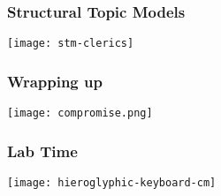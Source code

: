 \documentclass[11pt,compress,professionalfonts]{beamer}
\newcommand{\ita}{\begin{itemize}}
\newcommand{\itm}{\item[]}
\newcommand{\itz}{\end{itemize}}
\begin{document}
\begin{frame}[t,fragile]\frametitle{Structural Topic Models}

\centerline{\texttt{[image: stm-clerics]}}

\end{frame}
\begin{frame}[t,fragile]\frametitle{Wrapping up}

\centerline{\texttt{[image: compromise.png]}}


\end{frame}
\begin{frame}[t,fragile]\frametitle{Lab Time}

\centerline{\texttt{[image: hieroglyphic-keyboard-cm]}}

\end{frame}
%
%
%
%
%
%
%
%



\plain{}



%
%
%
%
%
%
%
%
%
\end{document}
